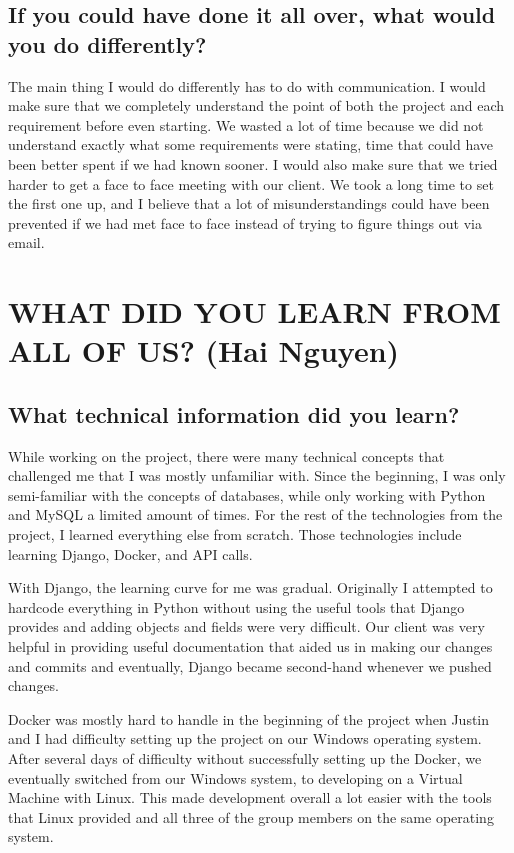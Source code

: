 \documentclass[draftclsnofoot,10pt,onecolumn]{IEEEtran} %
\begin{document}
\subsection{If you could have done it all over, what would you do differently?}
The main thing I would do differently has to do with communication. I would make
sure that we completely understand the point of both the project and each
requirement before even starting. We wasted a lot of time because we did not
understand exactly what some requirements were stating, time that could have
been better spent if we had known sooner. I would also make sure that we tried
harder to get a face to face meeting with our client. We took a long time to set
the first one up, and I believe that a lot of misunderstandings could have been
prevented if we had met face to face instead of trying to figure things out via
email.

\section{WHAT DID YOU LEARN FROM ALL OF US? (Hai Nguyen)}

\subsection{What technical information did you learn?}
While working on the project, there were many technical concepts that challenged
me that I was mostly unfamiliar with. Since the beginning, I was only
semi-familiar with the concepts of databases, while only working with Python and
MySQL a limited amount of times. For the rest of the technologies from the
project, I learned everything else from scratch. Those technologies include
learning Django, Docker, and API calls. 

With Django, the learning curve for me was gradual. Originally I attempted to
hardcode everything in Python without using the useful tools that Django
provides and adding objects and fields were very difficult. Our client was very
helpful in providing useful documentation that aided us in making our changes
and commits and eventually, Django became second-hand whenever we pushed
changes. 

Docker was mostly hard to handle in the beginning of the project when Justin and
I had difficulty setting up the project on our Windows operating system. After
several days of difficulty without successfully setting up the Docker, we
eventually switched from our Windows system, to developing on a Virtual Machine
with Linux. This made development overall a lot easier with the tools that Linux
provided and all three of the group members on the same operating system.
\end{document}
